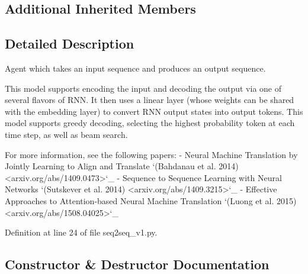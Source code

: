 \subsection*{Additional Inherited Members}


\subsection{Detailed Description}
\begin{DoxyVerb}Agent which takes an input sequence and produces an output sequence.

This model supports encoding the input and decoding the output via one of
several flavors of RNN. It then uses a linear layer (whose weights can
be shared with the embedding layer) to convert RNN output states into
output tokens. This model supports greedy decoding, selecting the
highest probability token at each time step, as well as beam
search.

For more information, see the following papers:
- Neural Machine Translation by Jointly Learning to Align and Translate
  `(Bahdanau et al. 2014) <arxiv.org/abs/1409.0473>`_
- Sequence to Sequence Learning with Neural Networks
  `(Sutskever et al. 2014) <arxiv.org/abs/1409.3215>`_
- Effective Approaches to Attention-based Neural Machine Translation
  `(Luong et al. 2015) <arxiv.org/abs/1508.04025>`_
\end{DoxyVerb}
 

Definition at line 24 of file seq2seq\+\_\+v1.\+py.



\subsection{Constructor \& Destructor Documentation}
\mbox{\label{classparlai_1_1agents_1_1legacy__agents_1_1seq2seq_1_1seq2seq__v1_1_1Seq2seqAgent_aea5753e8b1090fc88e657ada44492556}} 
